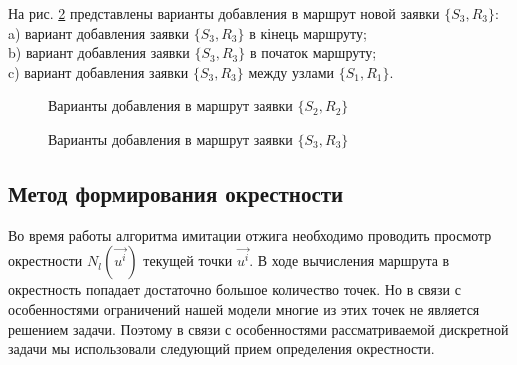 \documentclass[]{TAACpaper}
\begin{document}
На рис. \ref{ris:pict3} представлены варианты добавления в маршрут новой заявки $\{S_3,R_3\}$:\\
a) вариант добавления заявки $\{S_3,R_3\}$ в кінець маршруту;\\
b) вариант добавления заявки $\{S_3,R_3\}$ в початок маршруту;\\
c) вариант добавления заявки $\{S_3,R_3\}$ между узлами $\{S_1,R_1\}$.

\begin{figure}[t]
	\caption{Варианты добавления в маршрут заявки $\{S_2,R_2\}$}
	\label{ris:pict2}
\end{figure}

\begin{figure}[t]
	\caption{Варианты добавления в маршрут заявки $\{S_3,R_3\}$}
	\label{ris:pict3}
\end{figure}

\clearpage


\subsection{Метод формирования окрестности}
Во время работы алгоритма имитации отжига необходимо проводить просмотр окрестности $N_{l}(\vec{u^i})$ текущей точки $\vec{u^i}$. В ходе вычисления маршрута в окрестность попадает достаточно большое количество точек. Но в связи с особенностями ограничений нашей модели многие из этих точек не является решением задачи. Поэтому в связи с особенностями рассматриваемой дискретной задачи мы использовали следующий прием определения окрестности.
\end{document}
